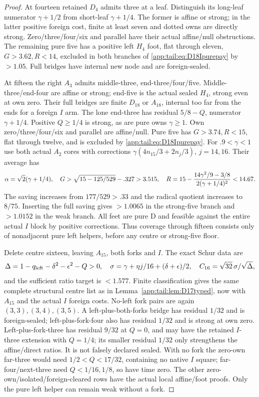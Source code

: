 \begin{proof}
At fourteen retained $D_4$ admits three at a leaf. Distinguish
its long-leaf numerator $\gamma+1/2$ from short-leaf
$\gamma+1/4$. The former is affine or strong; in the latter
positive foreign cost, finite at least seven and dotted owns
are directly strong. Zero/three/four/six and parallel have
their actual affine/null obstructions. The remaining pure
five has a positive left $H_4$ foot, flat through eleven,
$G>3.62,R<14$, excluded in both branches of
\eqref{app:tail:eq:D18Ipurepay} by $>1.05$.
Full bridges have internal new node and are foreign-sealed.

At fifteen the right $A_3$ admits middle-three, end-three/four/five.
Middle-three/end-four are affine or strong; end-five is the
actual sealed $H_4$, strong even at own zero.
Their full bridges are finite $D_{18}$ or $A_{18}$, internal
too far from the ends for a foreign $I$ arm.
The lone end-three has residual $5/8-Q$, numerator
$\gamma+1/4$. Positive $Q\ge1/4$ is strong, as are pure
owns $\gamma\ge1$. Own zero/three/four/six and parallel
are affine/null. Pure five has $G>3.74,R<15$, flat through
twelve, and is excluded by \eqref{app:tail:eq:D18Ipurepay}.
For $.9<\gamma<1$ use both actual $A_2$ cores with corrections
$\gamma(4n_{15}/3+2n_j/3)$, $j=14,16$.
Their average has
\[
 \alpha=\sqrt2(\gamma+1/4),\quad
 G>\sqrt{15-125/529}-.327>3.515,\quad
 R=15-{14\gamma^2/9-3/8\over2(\gamma+1/4)^2}<14.67.
\]
The saving increases from $177/529>.33$ and the radical
quotient increases to $8/75$. Inserting the full saving gives
$>1.0065$ in the strong-five branch and $>1.0152$ in the
weak branch. All feet are pure D and feasible against the
entire actual $I$ block by positive corrections.
Thus coverage through fifteen consists only of nonadjacent
pure left helpers, before any centre or strong-five floor.

Delete centre sixteen, leaving $A_{15}$, both forks and $I$.
The exact Schur data are
\[
 \Delta=1-q_{\rm left}-\delta^2-\epsilon^2-Q>0,
 \quad\sigma=\gamma+\eta j/16+(\delta+\epsilon)/2,
 \quad C_{16}=\sqrt{32}\,\sigma/\sqrt\Delta,
\]
and the sufficient ratio target is $<1.577$.
Finite classification gives the same complete structural centre
list as in Lemma~\ref{app:tail:lem:D17typed}, now with
$A_{15}$ and the actual $I$ foreign costs.
No-left fork pairs are again $(3,3),(3,4),(3,5)$.
A left-plus-both-forks bridge has residual $1/32$ and is
foreign-sealed; left-plus-fork-four also has residual $1/32$
and is strong at own zero. Left-plus-fork-three has residual
$9/32$ at $Q=0$, and may have the retained $I$-three extension
with $Q=1/4$; its smaller residual $1/32$ only strengthens
the affine/direct ratios. It is not falsely declared sealed.
With no fork the zero-own far-three would need
$1/2<Q<17/32$, containing no native $I$ square;
far-four/next-three need $Q<1/16,1/8$, so have time zero.
The other zero-own/isolated/foreign-cleared rows have the
actual local affine/foot proofs. Only the pure left helper
can remain weak without a fork.


\end{proof}
